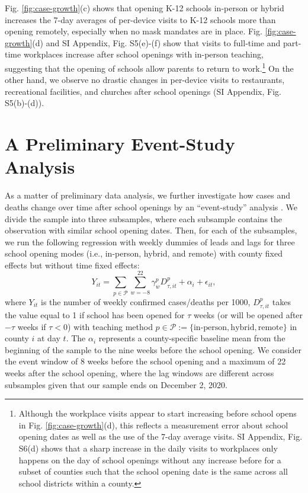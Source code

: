 \documentclass[9pt,twocolumn,twoside,lineno]{pnas-new}
\begin{document}
Fig.  \ref{fig:case-growth}(c) shows that opening K-12 schools in-person or hybrid increases the 7-day averages of per-device visits to K-12 schools more than opening remotely, especially when no mask mandates are in place.  Fig.  \ref{fig:case-growth}(d) and SI Appendix, Fig.  S5(e)-(f) show that visits to full-time and part-time workplaces increase after school openings with in-person teaching, suggesting that the opening of schools allow parents to return to work.\footnote{Although the workplace visits appear to start increasing before school opens in Fig.  \ref{fig:case-growth}(d), this reflects a measurement error about school opening dates as well as the use of the 7-day average visits. SI Appendix, Fig. S6(d)  shows that a sharp increase in the daily visits to workplaces only happens on the day of school openings without any increase before for a subset of counties such that the school opening date is the same across all school districts within a county. } On the other hand, we observe no drastic changes in per-device visits to restaurants, recreational facilities, and churches after school openings (SI Appendix, Fig.  S5(b)-(d)).
 
\section*{A Preliminary Event-Study Analysis}

As a matter of preliminary data analysis, we further investigate how cases and deaths change over time after school openings by an ``event-study'' analysis \citep[e.g.,][]{Callaway2020,Goodman-Bacon2018,Sun2020}. We divide the sample into three subsamples, where each subsample contains the observation with similar school opening dates. Then,  for each of the subsamples, we run the following regression with weekly dummies of leads and lags for three school opening modes (i.e., in-person, hybrid, and remote) with county fixed effects but without time fixed effects:
\begin{equation}\label{eq:event}
Y_{it} = \sum_{p\in\mathcal{P}}\sum_{w=-8}^{22} \gamma_w^p D_{\tau,it}^p   + \alpha_i +\epsilon_{it},
\end{equation}
where   $Y_{it}$ is the number of  weekly confirmed cases/deaths per 1000, $D_{\tau,it}^p$ takes the value equal to 1 if school has been opened  for $\tau$ weeks (or will be opened after $-\tau$ weeks if $\tau<0$) with teaching method $p\in \mathcal{P}:= \{\text{in-person},\text{hybrid},\text{remote}\}$  in county $i$ at day $t$.  The  $\alpha_i$ represents a county-specific baseline mean from the beginning of the sample to the nine weeks before the school opening.  We consider the event window of 8 weeks before the school opening and a maximum of 22 weeks after the school opening, where the lag windows are different across subsamples given that our sample ends on December 2, 2020.
\end{document}
